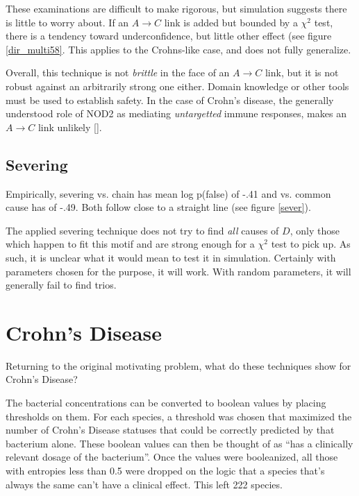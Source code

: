 \documentclass[letterpaper]{article}
\begin{document}
These examinations are difficult to make rigorous, but simulation
suggests there is little to worry about.  If an $A\rightarrow C$ link
is added but bounded by a $\chi^2$ test, there is a tendency toward
underconfidence, but little other effect (see figure
\ref{dir_multi58}.  This applies to the Crohns-like case, and does not
fully generalize.

Overall, this technique is not \textit{brittle} in the face of an
$A \rightarrow C$ link, but it is not robust against an arbitrarily
strong one either.  Domain knowledge or other tools must be used to
establish safety.  In the case of Crohn's disease, the generally
understood role of NOD2 as mediating \textit{untargetted} immune
responses, makes an $A\rightarrow C$ link unlikely [\cite{nod2}].

\subsection{Severing}

Empirically, severing vs. chain has mean log p(false) of -.41 and
vs. common cause has of -.49.  Both follow close to a straight line
(see figure \ref{sever}).

The applied severing technique does not try to find \textit{all}
causes of $D$, only
those which happen to fit this motif and are strong enough for a
$\chi^2$ test to pick up.  As such, it is unclear what it would mean
to test it in simulation.  Certainly with parameters chosen for the
purpose, it will work.  With random parameters, it will generally fail
to find trios.

\section{Crohn's Disease}

Returning to the original motivating problem, what do these techniques
show for Crohn's Disease?

The bacterial concentrations can be converted to boolean values by
placing thresholds on them.  For each species, a threshold was chosen that
maximized the number of Crohn's Disease statuses that could be
correctly predicted by that bacterium alone.  These boolean values can
then be thought of as ``has a clinically relevant dosage of the
bacterium''.  Once the values were booleanized, all those with
entropies less than 0.5 were dropped on the logic that a species
that's always the same can't have a clinical effect.  This left 222
species.
\end{document}
